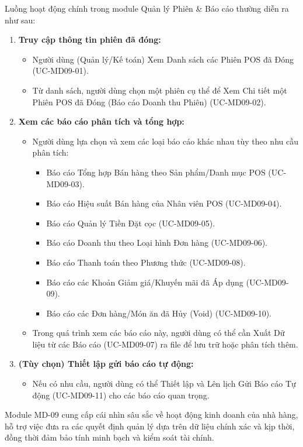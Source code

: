 \label{sssec:md09_overall_workflow}
Luồng hoạt động chính trong module Quản lý Phiên & Báo cáo thường diễn ra như sau:
\begin{enumerate}
    \item \textbf{Truy cập thông tin phiên đã đóng:}
        \begin{itemize}
            \item Người dùng (Quản lý/Kế toán) Xem Danh sách các Phiên POS đã Đóng (UC-MD09-01).
            \item Từ danh sách, người dùng chọn một phiên cụ thể để Xem Chi tiết một Phiên POS đã Đóng (Báo cáo Doanh thu Phiên) (UC-MD09-02).
        \end{itemize}
    \item \textbf{Xem các báo cáo phân tích và tổng hợp:}
        \begin{itemize}
            \item Người dùng lựa chọn và xem các loại báo cáo khác nhau tùy theo nhu cầu phân tích:
                \begin{itemize}
                    \item Báo cáo Tổng hợp Bán hàng theo Sản phẩm/Danh mục POS (UC-MD09-03).
                    \item Báo cáo Hiệu suất Bán hàng của Nhân viên POS (UC-MD09-04).
                    \item Báo cáo Quản lý Tiền Đặt cọc (UC-MD09-05).
                    \item Báo cáo Doanh thu theo Loại hình Đơn hàng (UC-MD09-06).
                    \item Báo cáo Thanh toán theo Phương thức (UC-MD09-08).
                    \item Báo cáo các Khoản Giảm giá/Khuyến mãi đã Áp dụng (UC-MD09-09).
                    \item Báo cáo các Đơn hàng/Món ăn đã Hủy (Void) (UC-MD09-10).
                \end{itemize}
            \item Trong quá trình xem các báo cáo này, người dùng có thể cần Xuất Dữ liệu từ các Báo cáo (UC-MD09-07) ra file để lưu trữ hoặc phân tích thêm.
        \end{itemize}
    \item \textbf{(Tùy chọn) Thiết lập gửi báo cáo tự động:}
        \begin{itemize}
            \item Nếu có nhu cầu, người dùng có thể Thiết lập và Lên lịch Gửi Báo cáo Tự động (UC-MD09-11) cho các báo cáo quan trọng.
        \end{itemize}
\end{enumerate}
Module MD-09 cung cấp cái nhìn sâu sắc về hoạt động kinh doanh của nhà hàng, hỗ trợ việc đưa ra các quyết định quản lý dựa trên dữ liệu chính xác và kịp thời, đồng thời đảm bảo tính minh bạch và kiểm soát tài chính.

